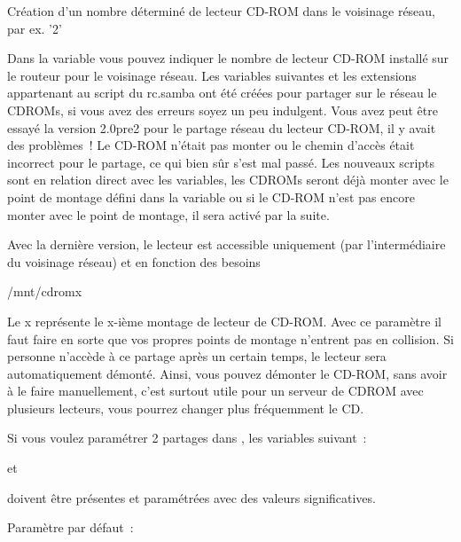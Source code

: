 \begin{description}

    Création d'un nombre déterminé de lecteur CD-ROM dans le voisinage réseau, par ex. '2'

        Dans la variable  vous pouvez indiquer le nombre
        de lecteur CD-ROM installé sur le routeur pour le voisinage réseau.
        Les variables suivantes et les extensions appartenant au script du
        rc.samba ont été créées pour partager sur le réseau le CDROMs, si
        vous avez des erreurs soyez un peu indulgent.
        Vous avez peut être essayé la version 2.0pre2 pour le partage réseau du
        lecteur CD-ROM, il y avait des problèmes~! Le CD-ROM n'était pas monter
        ou le chemin d'accès était incorrect pour le partage, ce qui bien sûr
        s'est mal passé.
        Les nouveaux scripts sont en relation direct avec les variables, les CDROMs
        seront déjà monter avec le point de montage défini dans la variable 
        ou si le CD-ROM n'est pas encore monter avec le point de montage, il
        sera activé par la suite.

        Avec la dernière version, le lecteur est accessible uniquement (par
        l'intermédiaire du voisinage réseau) et en fonction des besoins

        /mnt/cdromx

        Le x représente le x-ième montage de lecteur de CD-ROM. Avec ce
        paramètre il faut faire en sorte que vos propres points de montage
        n'entrent pas en collision. Si personne n'accède à ce partage après un
        certain temps, le lecteur sera automatiquement démonté. Ainsi, vous pouvez
        démonter le CD-ROM, sans avoir à le faire manuellement, c'est surtout
        utile pour un serveur de CDROM avec plusieurs lecteurs, vous pourrez
        changer plus fréquemment le CD.

        Si vous voulez paramétrer 2 partages dans , les
        variables suivant~:


        et


        doivent être présentes et paramétrées avec des valeurs significatives.

        Paramètre par défaut~: 

\end{description}


